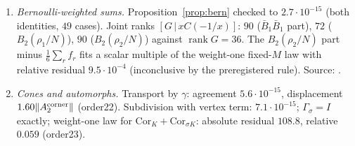 \begin{enumerate}[label=D.\arabic*,leftmargin=3em]
and $7.8\cdot10^{-15}$ (order18). The affine law with $c=0$ fails on $x\in(0,3]$ with absolute residual $54.4$; the parts of $A_2^{\rm corner}$ fail every tested law, the
smallest relative residual being $3.1\cdot10^{-3}$ for the $B_2(\rho_2/N)$ part at $w=1$ (order19).
\item\label{catB:o20} \emph{Bernoulli-weighted sums.} Proposition~\ref{prop:bern} checked to $2.7\cdot10^{-15}$ (both identities, $49$ cases). Joint ranks
$[G\,|\,xC(-1/x)]$: $90$ ($\bar B_1\bar B_1$ part), $72$ ($B_2(\rho_1/N)$), $90$ ($B_2(\rho_2/N)$) against $\operatorname{rank}G=36$. The $B_2(\rho_2/N)$ part minus $\frac16\sum_rf_r$ fits a
scalar multiple of the weight-one fixed-$M$ law with relative residual $9.5\cdot10^{-4}$ (inconclusive by the preregistered rule). Source: .
\item\label{catB:o23} \emph{Cones and automorphs.} Transport by $\gamma$: agreement $5.6\cdot10^{-15}$, displacement $1.60\|A_2^{\rm corner}\|$ (order22). Subdivision with vertex term:
$7.1\cdot10^{-15}$; $\Gamma_\sigma=I$ exactly; weight-one law for $\mathrm{Cor}_K+\mathrm{Cor}_{\sigma K}$: absolute residual $108.8$, relative $0.059$ (order23).
\end{enumerate}
